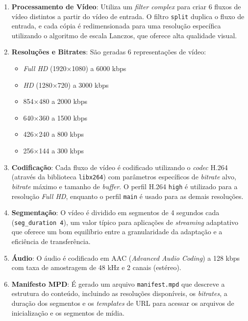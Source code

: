 \begin{enumerate}
    \item \textbf{Processamento de Vídeo}: Utiliza um \textit{filter complex} para criar 6 fluxos de vídeo distintos a partir do vídeo de entrada. O filtro \texttt{split} duplica o fluxo de entrada, e cada cópia é redimensionada para uma resolução específica utilizando o algoritmo de escala Lanczos, que oferece alta qualidade visual.
    
    \item \textbf{Resoluções e Bitrates}: São geradas 6 representações de vídeo:
    \begin{itemize}
        \item \textit{Full HD} (1920×1080) a 6000 kbps
        \item \textit{HD} (1280×720) a 3000 kbps
        \item 854×480 a 2000 kbps
        \item 640×360 a 1500 kbps
        \item 426×240 a 800 kbps
        \item 256×144 a 300 kbps
    \end{itemize}
    
    \item \textbf{Codificação}: Cada fluxo de vídeo é codificado utilizando o \textit{codec} H.264 (através da biblioteca \texttt{libx264}) com parâmetros específicos de \textit{bitrate} alvo, \textit{bitrate} máximo e tamanho de \textit{buffer}. O perfil H.264 \texttt{high} é utilizado para a resolução \textit{Full HD}, enquanto o perfil \texttt{main} é usado para as demais resoluções.
    
    \item \textbf{Segmentação}: O vídeo é dividido em segmentos de 4 segundos cada (\texttt{seg\_duration 4}), um valor típico para aplicações de \textit{streaming} adaptativo que oferece um bom equilíbrio entre a granularidade da adaptação e a eficiência de transferência.
    
    \item \textbf{Áudio}: O áudio é codificado em AAC (\textit{Advanced Audio Coding}) a 128 kbps com taxa de amostragem de 48 kHz e 2 canais (estéreo).
    
    \item \textbf{Manifesto MPD}: É gerado um arquivo \texttt{manifest.mpd} que descreve a estrutura do conteúdo, incluindo as resoluções disponíveis, os \textit{bitrates}, a duração dos segmentos e os \textit{templates} de URL para acessar os arquivos de inicialização e os segmentos de mídia.
\end{enumerate}

